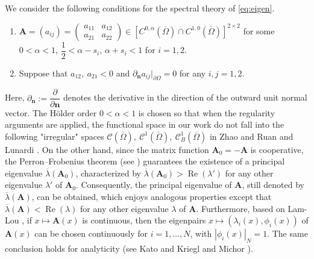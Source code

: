 \documentclass[a4paper,11pt]{amsart}
\theoremstyle{definition}
\def\O{\Omega}
\numberwithin{equation}{section}
\theoremstyle{definition}
\def\O{\Omega}
\begin{document}
We consider the following conditions for the spectral theory of \eqref{eq:eigen}.
\begin{enumerate}[label=(A\arabic*)]  

\item \label{cond:cond11} $\textbf{A}=(a_{ij})=\left(\begin{matrix}
a_{11}&a_{12}\\
a_{21}&a_{22}
\end{matrix}\right)\in [C^{0,\alpha}(\overline{\O})\cap C^{1,0}(\overline{\O})]^{2\times 2}$ for some $0<\alpha<1$, $\dfrac{1}{2}<\alpha-s_i$, $\alpha+s_i<1$ for $i=1,2$.

\item  \label{cond:cond21} Suppose that $a_{12},~a_{21}<0$ and $\partial_{\textbf{n}} a_{ij}|_{\partial \O}=0$ for any $i,j=1,2$.

\end{enumerate}
Here, $\partial_{\textbf{n}} := \dfrac{\partial}{\partial \textbf{n}}$ 
denotes the derivative in the direction of the outward unit normal vector. The Hölder order $0<\alpha<1$ is chosen so that when the regularity arguments are applied, the functional space in our work do not fall into the following "irregular" spaces $\mathcal{C}(\overline{\O}),~\mathcal{C}^1(\overline{\O}),~\mathcal{C}^1_B(\overline{\O})$ in Zhao and Ruan \cite[Section 2.2]{zhao_spatiotemporal_2025} and Lunardi \cite[Theorem 3.1.30]{lunardi_1995}. On the other hand, since the matrix function $\mathbf{A}_0 = -\mathbf{A}$ is cooperative, the Perron–Frobenius theorem (see \cite{gantmacher_theory_1959}) guarantees the existence of a principal eigenvalue $\overline{\lambda}(\mathbf{A}_0)$, characterized by $\overline{\lambda}(\mathbf{A}_0)>\operatorname{Re}(\lambda')$ for any other eigenvalue $\lambda'$ of $\mathbf{A}_0$. Consequently, the principal eigenvalue of $\mathbf{A}$, still denoted by $\overline{\lambda}(\mathbf{A})$, can be obtained, which enjoys analogous properties except that $\overline{\lambda}(\mathbf{A}) < \operatorname{Re}(\lambda)$ for any other eigenvalue $\lambda$ of $\mathbf{A}$. Furthermore, based on Lam-Lou \cite[Claim~4.2]{lam_ays_2016}, if $x \mapsto \mathbf{A}(x)$ is continuous, then the eigenpairs $x \mapsto (\lambda_i(x), \phi_i(x))$ of $\mathbf{A}(x)$ can be chosen continuously for $i=1,\dots,N$, with $|\phi_i(x)|_N = 1$. The same conclusion holds for analyticity (see Kato \cite[Chapter~2]{kato_1976} and Kriegl and Michor \cite{kriegl_michor_2003}).
\end{document}
